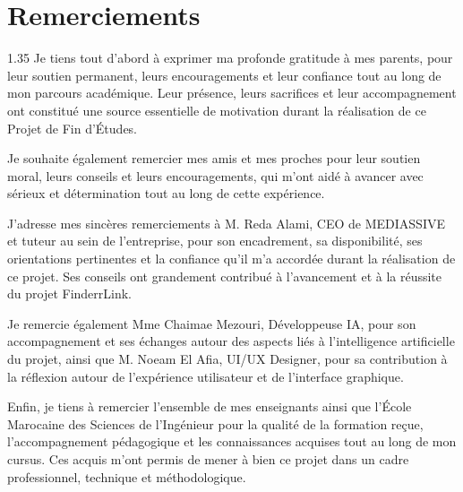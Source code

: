 \section*{\Huge Remerciements}

\vspace{0.7cm}

\begin{spacing}{1.35}
Je tiens tout d’abord à exprimer ma profonde gratitude à mes parents, pour leur soutien permanent, leurs encouragements et leur confiance tout au long de mon parcours académique. Leur présence, leurs sacrifices et leur accompagnement ont constitué une source essentielle de motivation durant la réalisation de ce Projet de Fin d’Études.

Je souhaite également remercier mes amis et mes proches pour leur soutien moral, leurs conseils et leurs encouragements, qui m’ont aidé à avancer avec sérieux et détermination tout au long de cette expérience.

J’adresse mes sincères remerciements à M. Reda Alami, CEO de MEDIASSIVE et tuteur au sein de l’entreprise, pour son encadrement, sa disponibilité, ses orientations pertinentes et la confiance qu’il m’a accordée durant la réalisation de ce projet. Ses conseils ont grandement contribué à l’avancement et à la réussite du projet FinderrLink.

Je remercie également Mme Chaimae Mezouri, Développeuse IA, pour son accompagnement et ses échanges autour des aspects liés à l’intelligence artificielle du projet, ainsi que M. Noeam El Afia, UI/UX Designer, pour sa contribution à la réflexion autour de l’expérience utilisateur et de l’interface graphique.

Enfin, je tiens à remercier l’ensemble de mes enseignants ainsi que l’École Marocaine des Sciences de l’Ingénieur pour la qualité de la formation reçue, l’accompagnement pédagogique et les connaissances acquises tout au long de mon cursus. Ces acquis m’ont permis de mener à bien ce projet dans un cadre professionnel, technique et méthodologique.
\end{spacing}
